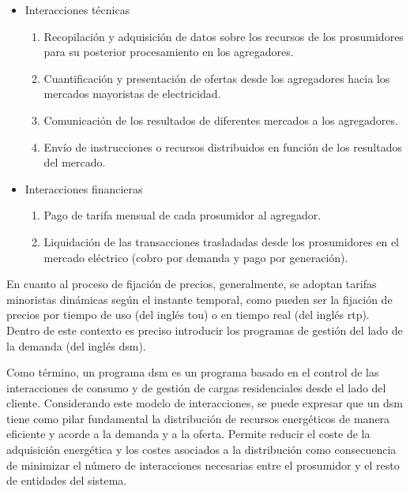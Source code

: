 \vspace{3mm}

\begin{itemize}
  \item Interacciones técnicas 
    \begin{enumerate}
      \item Recopilación y adquisición de datos sobre los recursos de los prosumidores para su posterior procesamiento en los agregadores.  
      \item Cuantificación y presentación de ofertas desde los agregadores hacia los mercados mayoristas de electricidad.
      \item Comunicación de los resultados de diferentes mercados a los agregadores.
      \item Envío de instrucciones o recursos distribuidos en función de los resultados del mercado.      
    \end{enumerate}

  \item Interacciones financieras
  \begin{enumerate}
    \item Pago de tarifa mensual de cada prosumidor al agregador.
    \item Liquidación de las transacciones trasladadas desde los prosumidores en el mercado eléctrico (cobro por demanda y pago por generación).    
  \end{enumerate}
\end{itemize}

\vspace{1mm}

En cuanto al proceso de fijación de precios, generalmente, se adoptan tarifas minoristas dinámicas según el instante temporal, como pueden ser la fijación de precios por tiempo de uso (del inglés \gls{tou}) o en tiempo real (del inglés \gls{rtp}). Dentro de este contexto es preciso introducir los programas de gestión del lado de la demanda (del inglés \gls{dsm}). 

\vspace{3mm}

Como término, un programa \gls{dsm} \cite{dsm} es un programa basado en el control de las interacciones de consumo y de gestión de cargas residenciales desde el lado del cliente. Considerando este modelo de interacciones, se puede expresar que un \gls{dsm} tiene como pilar fundamental la distribución de recursos energéticos de manera eficiente y acorde a la demanda y a la oferta. Permite reducir el coste de la adquisición energética y los costes asociados a la distribución como consecuencia de minimizar el número de interacciones necesarias entre el prosumidor y el resto de entidades del sistema. 

